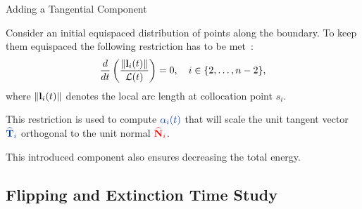 \documentclass[usenames,dvipsnames]{beamer}
\begin{document}
\begin{frame}{Adding a Tangential Component}
    \begin{minipage}[t]{0.55\textwidth}
    Consider an initial equispaced distribution of points along the boundary. To keep them equispaced the following restriction has to be met~\cite{Mikula2001, Barrett2007, Barrett2010}:
    \begin{equation*}
        \dfrac{d}{dt}\left(\dfrac{\left\lVert\mathbf{l}_i(t)\right\rVert}{\mathcal{L}(t)}\right)=0, \quad i\in \{2,\dots,n-2\},
    \end{equation*}
    where $\left\lVert\mathbf{l}_i(t)\right\rVert$ denotes the local arc length at collocation point $s_i$.
    
    This restriction is used to compute $\color{bb} \alpha_i(t)$ that will scale the unit tangent vector $\color{bb} \hatT_i$ orthogonal to the unit normal $\color{red}\widehat{\mathbf{N}}_i$.
    
    This introduced component also ensures decreasing the total energy.
    \end{minipage}%
    \begin{minipage}[t]{0.5\textwidth}
    \centering
\begin{figure}
\end{figure}
    \end{minipage}%
\end{frame}


\subsection{Flipping and Extinction Time Study}
\end{document}
